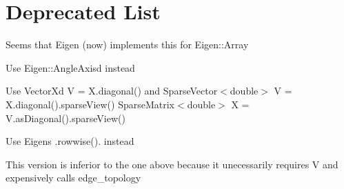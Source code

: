 \chapter{Deprecated List}
\hypertarget{deprecated}{}\label{deprecated}

\begin{DoxyRefList}
\item[Member \doxylink{namespaceigl_abb6eac390a632bb79342e36438b03807}{igl\+::any\+\_\+of} (const Mat \&S)]\label{deprecated__deprecated000001}%
%
Seems that Eigen (now) implements this for {\ttfamily Eigen\+::\+Array}  
\item[Member \doxylink{namespaceigl_af6bab06e3533fb4130d508453175889f}{igl\+::axis\+\_\+angle\+\_\+to\+\_\+quat} (const Q\+\_\+type \texorpdfstring{$\ast$}{*}axis, const Q\+\_\+type angle, Q\+\_\+type \texorpdfstring{$\ast$}{*}out)]\label{deprecated__deprecated000002}%
%
Use {\ttfamily Eigen\+::\+Angle\+Axisd} instead  
\item[Member \doxylink{namespaceigl_afc7d0ecd1acd535cee662dd648fdbd80}{igl\+::diag} (const Eigen\+::\+Sparse\+Matrix$<$ T $>$ \&X, Eigen\+::\+Sparse\+Vector$<$ T $>$ \&V)]\label{deprecated__deprecated000004}%
%
Use {\ttfamily Vector\+Xd V = X.\+diagonal()} and {\ttfamily Sparse\+Vector\texorpdfstring{$<$}{<}double\texorpdfstring{$>$}{>} V = X.\+diagonal().sparse\+View()} {\ttfamily Sparse\+Matrix\texorpdfstring{$<$}{<}double\texorpdfstring{$>$}{>} X = V.\+as\+Diagonal().sparse\+View()} 
\item[Member \doxylink{namespaceigl_a23322b4cdcba5a31a7e95dc0a29b83f1}{igl\+::dot\+\_\+row} (const Eigen\+::\+Plain\+Object\+Base$<$ Derived\+V $>$ \&A, const Eigen\+::\+Plain\+Object\+Base$<$ Derived\+V $>$ \&B)]\label{deprecated__deprecated000005}%
%
Use Eigen\textquotesingle{}s {\ttfamily .rowwise().} instead  
\item[Member \doxylink{namespaceigl_aef9789170b7173db5255844fba17fbd1}{igl\+::euler\+\_\+characteristic} (const Eigen\+::\+Matrix\+Base$<$ Scalar $>$ \&V, const Eigen\+::\+Matrix\+Base$<$ Index $>$ \&F)]\label{deprecated__deprecated000006}%
%
This version is inferior to the one above because it unecessarily requires V and expensively calls edge\+\_\+topology  
\item[Member \doxylink{namespaceigl_a121c2475eac322f9100caf8433c66ad1}{igl\+::get\+\_\+seconds\+\_\+hires} ()]\label{deprecated__deprecated000007}%

\end{DoxyRefList}

